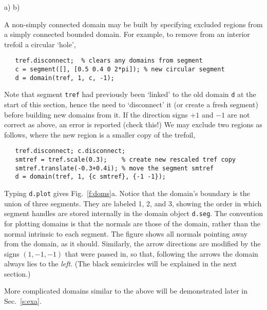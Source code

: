 \bfi %
a)
b)
\efi

A non-simply connected domain may be built by specifying excluded
regions from a simply connected bounded domain. For example,
to remove from an interior trefoil a circular `hole',
\begin{verbatim}
   tref.disconnect;  % clears any domains from segment
   c = segment([], [0.5 0.4 0 2*pi]); % new circular segment
   d = domain(tref, 1, c, -1);
\end{verbatim}
Note that segment {\tt tref} had previously
been `linked' to the old domain {\tt d}
at the start of this section, hence the need to `disconnect' it
(or create a fresh segment) before
building new domains from it. 
If the direction signs $+1$ and $-1$ are not correct as above, an
error is reported (check this!)
We may exclude two regions as follows, where the new region is a smaller copy
of the trefoil,
\begin{verbatim}
   tref.disconnect; c.disconnect;
   smtref = tref.scale(0.3);    % create new rescaled tref copy
   smtref.translate(-0.3+0.4i); % move the segment smtref
   d = domain(tref, 1, {c smtref}, {-1 -1});
\end{verbatim}
Typing {\tt d.plot} gives Fig.~\ref{f:doms}a. Notice that
the domain's boundary is the union of three segments. They are labeled
1, 2, and 3, showing the order in which segment handles
are stored internally in the domain object {\tt d.seg}.
The convention for plotting domains is that the normals
are those of the domain, rather than the normal intrinsic to each segment.
The figure shows all normals pointing away from the domain, as it should.
Similarly, the arrow directions are modified by the signs $(1,-1,-1)$ that
were passed in, so that, following the arrows the domain always lies to
the {\em left}. (The black semicircles will be explained in the next section.)

More complicated domains similar to the above will be demonstrated later in
Sec.~\ref{s:exa}.

\vspace{10ex}



